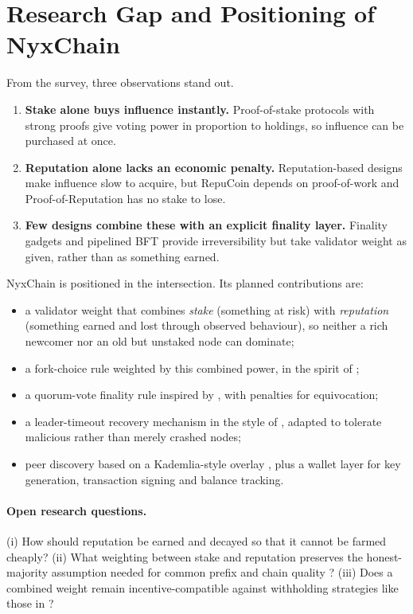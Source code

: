 \documentclass[11pt,a4paper]{article}
\begin{document}
\section{Research Gap and Positioning of NyxChain}\label{sec:gap}

From the survey, three observations stand out.

\begin{enumerate}
\item \textbf{Stake alone buys influence instantly.} Proof-of-stake protocols with strong proofs \cite{kiayias2017,david2018,gilad2017} give voting power in proportion to holdings, so influence can be purchased at once.
\item \textbf{Reputation alone lacks an economic penalty.} Reputation-based designs \cite{yu2019,aluko2021} make influence slow to acquire, but RepuCoin depends on proof-of-work and Proof-of-Reputation has no stake to lose.
\item \textbf{Few designs combine these with an explicit finality layer.} Finality gadgets and pipelined BFT \cite{buterin2017,yin2019} provide irreversibility but take validator weight as given, rather than as something earned.
\end{enumerate}

NyxChain is positioned in the intersection. Its planned contributions are:

\begin{itemize}
\item a validator weight that combines \emph{stake} (something at risk) with \emph{reputation} (something earned and lost through observed behaviour), so neither a rich newcomer nor an old but unstaked node can dominate;
\item a fork-choice rule weighted by this combined power, in the spirit of \cite{sompolinsky2015};
\item a quorum-vote finality rule inspired by \cite{buterin2017,yin2019}, with penalties for equivocation;
\item a leader-timeout recovery mechanism in the style of \cite{ongaro2014}, adapted to tolerate malicious rather than merely crashed nodes;
\item peer discovery based on a Kademlia-style overlay \cite{maymounkov2002}, plus a wallet layer for key generation, transaction signing and balance tracking.
\end{itemize}

\paragraph{Open research questions.} (i) How should reputation be earned and decayed so that it cannot be farmed cheaply? (ii) What weighting between stake and reputation preserves the honest-majority assumption needed for common prefix and chain quality \cite{garay2015}? (iii) Does a combined weight remain incentive-compatible against withholding strategies like those in \cite{eyal2014}?
\end{document}
